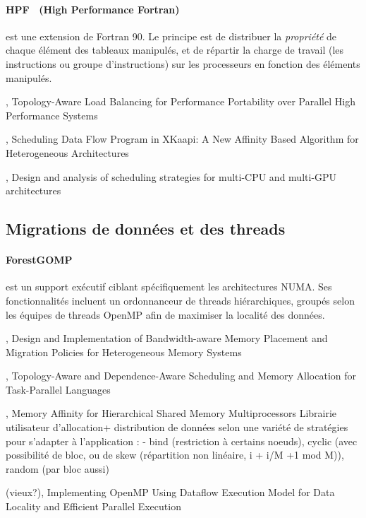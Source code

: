 \paragraph{HPF~\cite{HPF} (High Performance Fortran)} est une extension de Fortran 90.
Le principe est de distribuer la \emph{propriété} de chaque élément des tableaux manipulés, et de répartir la charge de travail (les instructions ou groupe d'instructions) sur les processeurs en fonction des éléments manipulés.


\cite{Pilla2014}, Topology-Aware Load Balancing for Performance Portability over Parallel High Performance Systems


\cite{Bleuse2014}, Scheduling Data Flow Program in XKaapi: A New Affinity Based Algorithm for Heterogeneous Architectures

\cite{Lima2015}, Design and analysis of scheduling strategies for multi-CPU and multi-GPU architectures

\subsection{Migrations de données et des threads}

\paragraph{ForestGOMP~\cite{Broquedis2010a}} est un support exécutif ciblant spécifiquement les architectures NUMA.
Ses fonctionnalités incluent un ordonnanceur de threads hiérarchiques, groupés selon les équipes de threads OpenMP afin de maximiser la localité des données.

\cite{Yu2017}, Design and Implementation of Bandwidth-aware Memory Placement and Migration Policies for Heterogeneous Memory Systems


\cite{Drebes2014}, Topology-Aware and Dependence-Aware Scheduling and Memory Allocation for Task-Parallel Languages

\cite{Pousa2009}, Memory Affinity for Hierarchical Shared Memory Multiprocessors
Librairie utilisateur d'allocation+ distribution de données selon une variété de stratégies pour s'adapter à l'application :
 - bind (restriction à certains noeuds), cyclic (avec possibilité de bloc, ou de skew (répartition non linéaire, i + i/M +1 mod M)), random (par bloc aussi)



(vieux?)\cite{Weng2002}, Implementing OpenMP Using Dataflow Execution Model for Data Locality and Efficient Parallel Execution

